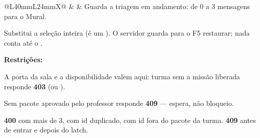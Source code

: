 \begin{tabularx}{\linewidth}{@{}L{40mm}L{24mm}X@{}}
 &  & Guarda a triagem em andamento: de 0 a 3 mensagens para o Mural.\par Substitui a seleção inteira (é um ). O servidor guarda para o F5 restaurar; nada conta até o .\par \textbf{Restrições:}\par \hspace*{1em}\textbullet{} A porta da sala  e a disponibilidade  valem aqui: turma sem a missão liberada responde \textbf{403}  (ou ).\par \hspace*{1em}\textbullet{} Sem pacote aprovado pelo professor responde \textbf{409}  --- espera, não bloqueio.\par \hspace*{1em}\textbullet{} \textbf{400}  com mais de 3,  com id duplicado,  com id fora do pacote da turma. \textbf{409}  antes de entrar e  depois do latch.\\

\end{tabularx}
